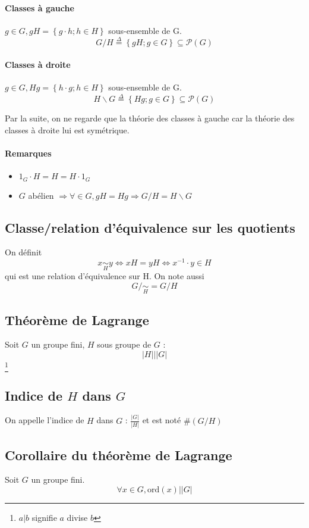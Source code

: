 \documentclass[a4paper,10pt]{report}
\newcommand{\grp}[1]{\left\langle #1 \right\rangle} %
\newcommand{\set}[1]{\left\lbrace #1 \right\rbrace } %
\newcommand{\so}{\Rightarrow}
\newcommand{\ord}{\mathrm{ord}} %
\newcommand{\mfootnote}[1]{\up{(}\footnote{#1}\up{)}}
\begin{document}
   \paragraph{Classes à gauche}
    $g\in G, gH = \set{g \cdot h ; h \in H}$ sous-ensemble de G.
    $$G/H \overset{\Delta}{=} \set{gH;g \in G} \subseteq \mathcal{P}(G)$$
   \paragraph{Classes à droite}
    $g\in G, Hg = \set{h \cdot g ; h \in H}$ sous-ensemble de G.
    $$H\backslash G 
    \overset{\Delta}{=}\set{Hg;g \in G} \subseteq \mathcal{P}(G)$$

   Par la suite, on ne regarde que la théorie des classes à gauche car la
   théorie des classes à droite lui est symétrique.

   \paragraph{Remarques} 
    \begin{itemize}
      \item $1_G\cdot H=H=H\cdot 1_G$
      \item $G$ abélien $\so \forall \in G, gH=Hg \so G/H = H\backslash G$
    \end{itemize}
 
   \subsection{Classe/relation d'équivalence sur les quotients}
    On définit
    $$x \underset{H}{\sim} y \iff xH=yH \iff x^{-1} \cdot y \in H$$
    qui est une relation d'équivalence sur H. On note aussi
    $$G/\underset{H}{\sim} =G/H$$
 
   \subsection{Théorème de Lagrange}
    Soit $G$ un groupe fini, $H$ sous groupe de $G$ :
    $$|H| \Big| |G|$$\mfootnote{$a \Big| b$ signifie $a$ divise $b$}
 
   \subsection{Indice de $H$ dans $G$}
    On appelle l'indice de $H$ dans $G$ : $\frac{|G|}{|H|}$ et est noté
    $\#(G/H)$
 
   \subsection{Corollaire du théorème de Lagrange}
    Soit $G$ un groupe fini.
    $$\forall x \in G, \ord(x) \Big| |G|$$
    \begin{comment}
      \mfootnote{Preuve: Appliquer le thm de Lagrange à $H=\grp{x}$,
      02/10/08 p2}
    \end{comment}
\end{document}
